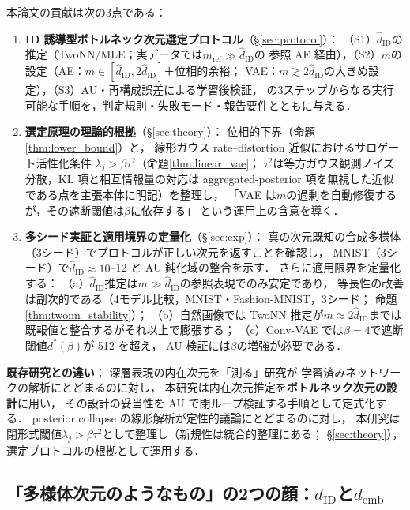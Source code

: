 \documentclass[11pt,a4paper]{jsarticle}
\newcommand{\dID}{d_{\mathrm{ID}}}
\newcommand{\hatdID}{\hat{d}_{\mathrm{ID}}}
\newcommand{\demb}{d_{\mathrm{emb}}}
\newcommand{\dstar}{d^{*}(\beta)}
\begin{document}
本論文の貢献は次の3点である：
\begin{enumerate}
  \item \textbf{ID 誘導型ボトルネック次元選定プロトコル}（§\ref{sec:protocol}）：
        （S1）$\hatdID$の推定（TwoNN/MLE；実データでは$m_{\mathrm{ref}} \gg \hatdID$の
        参照 AE 経由），（S2）$m$の設定（AE：$m \in [\hatdID, 2\hatdID]$＋位相的余裕；
        VAE：$m \gtrsim 2\hatdID$の大きめ設定），（S3）AU・再構成誤差による学習後検証，
        の3ステップからなる実行可能な手順を，判定規則・失敗モード・報告要件とともに与える．
  \item \textbf{選定原理の理論的根拠}（§\ref{sec:theory}）：
        位相的下界（命題\ref{thm:lower_bound}）と，
        線形ガウス rate--distortion 近似におけるサロゲート活性化条件
        $\lambda_j > \beta\tau^2$（命題\ref{thm:linear_vae}；
        $\tau^2$は等方ガウス観測ノイズ分散，KL 項と相互情報量の対応は
        aggregated-posterior 項を無視した近似である点を主張本体に明記）を整理し，
        「VAE は$m$の過剰を自動修復するが，その遮断閾値は$\beta$に依存する」
        という運用上の含意を導く．
  \item \textbf{多シード実証と適用境界の定量化}（§\ref{sec:exp}）：
        真の次元既知の合成多様体（3シード）でプロトコルが正しい次元を返すことを確認し，
        MNIST（3シード）で$\hatdID \approx 10$--12 と AU 鈍化域の整合を示す．
        さらに適用限界を定量化する：
        （a）$\hatdID$推定は$m \gg \hatdID$の参照表現でのみ安定であり，
        等長性の改善は副次的である（4モデル比較，MNIST・Fashion-MNIST，3シード；
        命題\ref{thm:twonn_stability}）；
        （b）自然画像では TwoNN 推定が$m \approx 2\hatdID$までは
        既報値\cite{pope2021intrinsic}と整合するがそれ以上で膨張する；
        （c）Conv-VAE では$\beta = 4$で遮断閾値$\dstar$が 512 を超え，
        AU 検証には$\beta$の増強が必要である．
\end{enumerate}

\textbf{既存研究との違い}：
深層表現の内在次元を「測る」研究\cite{ansuini2019intrinsic,pope2021intrinsic,valeriani2023geometry}が
学習済みネットワークの解析にとどまるのに対し，
本研究は内在次元推定を\textbf{ボトルネック次元の設計}に用い，
その設計の妥当性を AU で閉ループ検証する手順として定式化する．
posterior collapse の線形解析\cite{lucas2019elbo}が定性的議論にとどまるのに対し，
本研究は閉形式閾値$\lambda_j > \beta\tau^2$として整理し（新規性は統合的整理にある；
§\ref{sec:theory}），選定プロトコルの根拠として運用する．

\subsection{「多様体次元のようなもの」の2つの顔：$\dID$と$\demb$}\label{sec:intro_dim}
\end{document}
